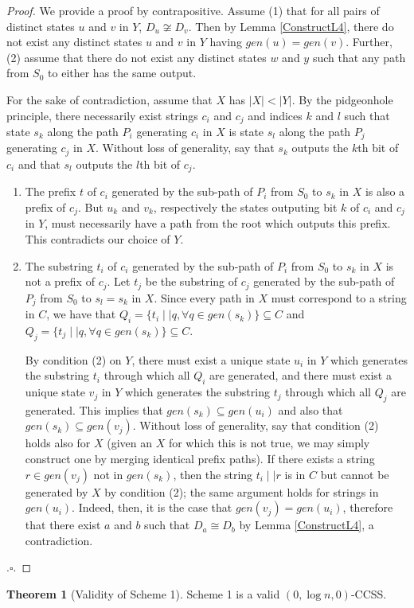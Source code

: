 \documentclass{article}
\theoremstyle{definition}
\newtheorem{theorem}{Theorem}[section]
\begin{document}
\begin{proof}
We provide a proof by contrapositive.  Assume (1) that for all pairs of distinct states 
$u$ and $v$ in $Y$, $D_u \not\cong D_v$. Then by Lemma \ref{ConstructL4}, there do not exist any distinct states $u$ and $v$ in $Y$ having $gen(u) = gen(v)$.  Further, (2) assume that there do not exist 
any distinct states $w$ and $y$ such that any path from $S_0$ to either has the same output.

For the sake of contradiction, assume that $X$ has $\lvert X \rvert < \lvert Y \rvert$.  By the 
pidgeonhole principle, there necessarily exist strings $c_i$ and $c_j$ and indices $k$ and $l$ 
such that state $s_k$ along the path $P_i$ generating $c_i$ in $X$ is state $s_l$ along the path 
$P_j$ generating $c_j$ in $X$.  Without loss of generality, say that $s_k$ outputs the $k$th bit of 
$c_i$ and that $s_l$ outputs the $l$th bit of $c_j$.

\begin{enumerate}
\item{The prefix $t$ of $c_i$ generated by the sub-path of $P_i$ from $S_0$ to $s_k$ in $X$ is also a prefix of 
$c_j$.  But $u_k$ and $v_k$, respectively the states outputing bit $k$ of $c_i$ and $c_j$ 
in $Y$, must necessarily have a path from the root which outputs this prefix.  
This contradicts our choice of $Y$.}
\item{The substring $t_i$ of $c_i$ generated by the sub-path of $P_i$ from $S_0$ to $s_k$ in $X$ is not a 
prefix of $c_j$.  Let $t_j$ be the substring of $c_j$ generated by the sub-path of $P_j$ 
from $S_0$ to $s_l=s_k$ in $X$.  Since every path in $X$ must correspond to a string in 
$C$, we have that $Q_i = \{ t_i \mid \mid q, \forall q \in gen(s_k)\} \subseteq C$ 
and $Q_j = \{ t_j \mid \mid q, \forall q \in gen(s_k)\} \subseteq C$.  

By condition (2) 
on $Y$, there must exist a unique state $u_i$ in $Y$ which generates the substring $t_i$ 
through which all $Q_i$ are generated, 
and there must exist a unique state $v_j$ in $Y$ which generates the substring $t_j$ through 
which all $Q_j$ are generated.  This implies that $gen(s_k) \subseteq gen(u_i)$ and also 
that $gen(s_k) \subseteq gen(v_j)$.  Without loss of generality, say that condition (2) 
holds also for $X$ (given an $X$ for which this is not true, we may simply construct 
one by merging identical prefix paths).  If there exists a string $r \in gen(v_j)$ 
not in $gen(s_k)$, then the string $t_i\mid\mid r$ is in $C$ but cannot be 
generated by $X$ by condition (2); the same argument holds for strings in $gen(u_i)$.  
Indeed, then, it is the case that $gen(v_j) = gen(u_i)$, therefore that 
there exist $a$ and $b$ such that $D_a \cong D_b$ by Lemma \ref{ConstructL4}, a 
contradiction.}
\end{enumerate}
.$\square$.
\end{proof}
\clearpage
\begin{theorem}[Validity of Scheme 1]
Scheme 1 is a valid $(0, \log{n}, 0)$-CCSS.
\end{theorem}
\end{document}

